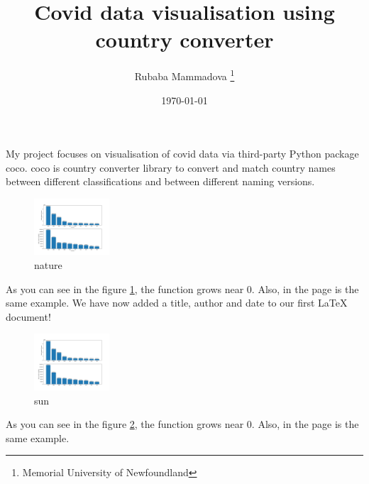 \documentclass[12pt, letterpaper, twoside]{article}
\title{Covid data visualisation using country converter}
\author{Rubaba Mammadova \thanks{Memorial University of Newfoundland}}
\date{\today}
\begin{document}
\maketitle
My project focuses on visualisation of covid data via third-party Python package coco. coco is country converter library to convert and match country names between different classifications and between different naming versions. 
 \begin{figure}[h]
    \centering
    \includegraphics[width=0.25\textwidth]{plot1.jpg}
    \caption{nature}
    \label{fig:myplot1 label}
\end{figure}
 
As you can see in the figure \ref{fig:myplot1 label}, the 
function grows near 0. Also, in the page \pageref{fig:myplot1 label} 
is the same example.
We have now added a title, author and date to our first \LaTeX{} document!
 \begin{figure}[h]
    \centering
    \includegraphics[width=0.25\textwidth]{plot2.jpg}
    \caption{sun}
    \label{fig:sun}
\end{figure}
 
As you can see in the figure \ref{fig:sun}, the 
function grows near 0. Also, in the page \pageref{fig:sun} 
is the same example.
\end{document}
